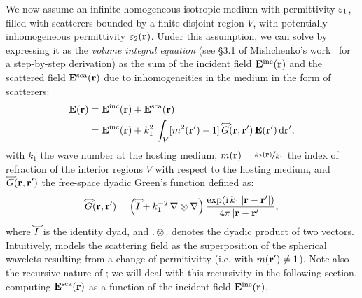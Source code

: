 We now assume an infinite homogeneous isotropic medium with permittivity $\varepsilon_1$, filled with scatterers bounded by a finite disjoint region $V$, with potentially inhomogeneous permittivity $\varepsilon_2(\mathbf{r})$. Under this assumption, we can solve  by expressing it as the \emph{volume integral equation} (see \S 3.1 of Mishchenko's work~ for a step-by-step derivation) as the sum of the incident field $\mathbf{E}^\text{inc}(\mathbf{r})$ and the scattered field $\mathbf{E}^\text{sca}(\mathbf{r})$ due to inhomogeneities in the medium in the form of scatterers:
%
\begin{align}
    \mathbf{E}(\mathbf{r}) & = \mathbf{E}^\text{inc}(\mathbf{r}) + \mathbf{E}^\text{sca}(\mathbf{r}) \\
    & =\mathbf{E}^\text{inc}(\mathbf{r}) + k_1^2\,\int_V [m^2(\mathbf{r}')-1] \,\accentset{\Longleftrightarrow}{G}(\mathbf{r},\mathbf{r}') \,\mathbf{E}(\mathbf{r}') \,\text{d}\mathbf{r}',
    \label{eq:vri}
\end{align}
%
with $k_1$ the wave number at the hosting medium, $m(\mathbf{r}) = \nicefrac{k_2(\mathbf{r})}{k_1}$ the index of refraction of the interior regions $V$ with respect to the hosting medium, and $\accentset{\Longleftrightarrow}{G}(\mathbf{r},\mathbf{r}')$ the free-space dyadic Green's function defined as:
%
\begin{equation}
    \accentset{\Longleftrightarrow}{G}(\mathbf{r},\mathbf{r}') = \left(\accentset{\Longleftrightarrow}{I} + k_1^{-2}\,\nabla\otimes\nabla\right) \frac{\exp(\text{i}\,k_1 \,|\mathbf{r}-\mathbf{r}'|)}{4\pi\,|\mathbf{r}-\mathbf{r}'|},
    \label{eq:greenfunc}
\end{equation}
%
where $\accentset{\Longleftrightarrow}{I}$ is the identity dyad, and $. \otimes .$ denotes the dyadic product of two vectors. Intuitively,  models the scattering field as the superposition of the spherical wavelets resulting from a change of permitivitty (i.e. with $m(\mathbf{r}')\neq1$). Note also the recursive nature of ; we will deal with this recursivity in the following section, computing $\mathbf{E}^\text{sca}(\mathbf{r})$ as a function of the incident field $\mathbf{E}^\text{inc}(\mathbf{r})$. 



